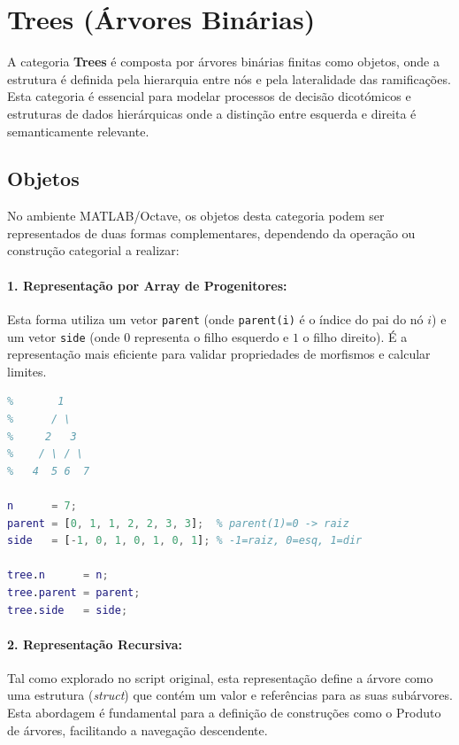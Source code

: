 \section{Trees (Árvores Binárias)}
\label{sec:modeling-trees}

A categoria \textbf{Trees} é composta por árvores binárias finitas como objetos, onde a estrutura é definida pela hierarquia entre nós e pela lateralidade das ramificações. Esta categoria é essencial para modelar processos de decisão dicotómicos e estruturas de dados hierárquicas onde a distinção entre esquerda e direita é semanticamente relevante.

\subsection{Objetos}
No ambiente MATLAB/Octave, os objetos desta categoria podem ser representados de duas formas complementares, dependendo da operação ou construção categorial a realizar:

\paragraph{1. Representação por Array de Progenitores:}
Esta forma utiliza um vetor \texttt{parent} (onde \texttt{parent(i)} é o índice do pai do nó $i$) e um vetor \texttt{side} (onde $0$ representa o filho esquerdo e $1$ o filho direito). É a representação mais eficiente para validar propriedades de morfismos e calcular limites.

\begin{lstlisting}[language=Matlab, caption={Representação por Array de Progenitores}]
% Arvore com 7 nos: raiz=1, filhos esquerdos/direitos indicados
%       1
%      / \
%     2   3
%    / \ / \
%   4  5 6  7

n      = 7;
parent = [0, 1, 1, 2, 2, 3, 3];  % parent(1)=0 -> raiz
side   = [-1, 0, 1, 0, 1, 0, 1]; % -1=raiz, 0=esq, 1=dir

tree.n      = n;
tree.parent = parent;
tree.side   = side;
\end{lstlisting}

\paragraph{2. Representação Recursiva:}
Tal como explorado no script original, esta representação define a árvore como uma estrutura (\textit{struct}) que contém um valor e referências para as suas subárvores. Esta abordagem é fundamental para a definição de construções como o Produto de árvores, facilitando a navegação descendente.

